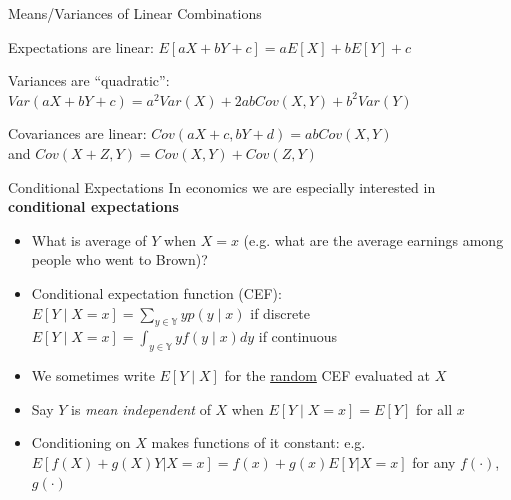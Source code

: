 \documentclass[11pt,english,handout]{beamer}
\newenvironment{wideitemize}{\itemize\addtolength{\itemsep}{10pt}}{\enditemize}
\begin{document}
\begin{frame}{Means/Variances of Linear Combinations}
\begin{wideitemize}

\item
Expectations are linear: $E[aX+bY+c]=aE[X]+bE[Y]+c$ 

\pause

\item Variances are ``quadratic'':  $Var(aX+bY+c)=a^2Var(X)+2abCov(X,Y)+b^2Var(Y)$

\pause
\item
Covariances are linear: $Cov(aX+c,bY+d)=abCov(X,Y)$ \\ and $Cov(X+Z,Y)=Cov(X,Y)+Cov(Z,Y)$

\end{wideitemize}

\end{frame}

\begin{frame}{Conditional Expectations}
\vspace{0.2cm}
In economics we are especially interested in \textbf{conditional expectations}

\begin{itemize}
\item What is average of $Y$ when $X=x$ (e.g. what are the average earnings among people who went to Brown)?
\pause 
	
\item Conditional expectation function (CEF): \\$E[Y\mid X=x]=\sum_{y\in\mathbb{Y}} y p(y\mid x)$ if discrete \\
$E[Y\mid X=x]=\int_{y\in\mathbb{Y}} y f(y\mid x) dy$ if continuous

\vspace{0.1cm}\pause{}
\item We sometimes write $E[Y\mid X]$ for the \uline{random} CEF evaluated at $X$
\vspace{0.1cm}\pause{}
\item Say $Y$ is \emph{mean independent} of $X$ when $E[Y\mid X=x]=E[Y]$ for all $x$
\vspace{0.1cm}\pause{}
\item Conditioning on $X$ makes functions of it constant: e.g. $E[f(X)+g(X)Y|X=x]=f(x)+g(x)E[Y|X=x]$ for any $f(\cdot)$, $g(\cdot)$
\end{itemize}

\end{frame}
\end{document}
